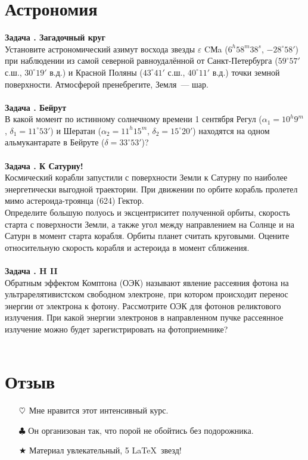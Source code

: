 \documentclass[11pt]{article}
\newcounter{astron}[section]
\newcommand{\heart}{\ensuremath\heartsuit}
\newenvironment{astro}[1]{\textbf{\stepcounter{astron}Задача \theastron. #1 \vspace{5pt}\\}}{\\\\}
\begin{document}
    \section{Астрономия}
    \begin{astro}{Загадочный круг}
        Установите астрономический азимут восхода звезды $\varepsilon$ CМa ($6^h58^m38^s$, $-28^\circ58'$) при наблюдении из самой северной равноудалённой от Санкт-Петербурга ($59^\circ57'$ с.ш., $30^\circ19'$ в.д.) и Красной Поляны ($43^\circ41'$ с.ш., $40^\circ11'$ в.д.) точки земной поверхности. Атмосферой пренебрегите, Земля~--- шар.
    \end{astro}
    \begin{astro}{Бейрут}
        В какой момент по истинному солнечному времени 1 сентября Регул ($\alpha_1 = 10^h9^m$, $\delta_1 = 11^\circ53'$) и Шератан ($\alpha_2 = 11^h15^m$, $\delta_2 = 15^\circ20'$) находятся на одном альмукантарате в Бейруте ($\delta = 33^\circ53'$)?
    \end{astro}
    \begin{astro}{К Сатурну!}
        Космический корабли запустили с поверхности Земли к Сатурну по наиболее энергетически выгодной траектории. При движении по орбите корабль пролетел мимо астероида-троянца (624) Гектор.\\
        Определите большую полуось и эксцентриситет полученной орбиты, скорость старта с поверхности Земли, а также угол между направлением на Солнце и на Сатурн в момент старта корабля. Орбиты планет считать круговыми. Оцените относительную скорость корабля и астероида в момент сближения.
    \end{astro}
    \begin{astro}{H II}
        Обратным эффектом Комптона (ОЭК) называют явление рассеяния фотона на ультрарелятивистском свободном электроне, при котором происходит перенос энергии от электрона к фотону.  Рассмотрите ОЭК для фотонов реликтового излучения. При какой энергии электронов в направленном пучке рассеянное излучение можно будет зарегистрировать на фотоприемнике?
    \end{astro}

    \section{Отзыв}
    \begin{itemize}
        \item[$\heart$] Мне нравится этот интенсивный курс.
        \item[$\clubsuit$] Он организован так, что порой не обойтись без подорожника.
        \item[$\bigstar$] Материал увлекательный, 5 \LaTeX ~звезд!
    \end{itemize}
\end{document}
